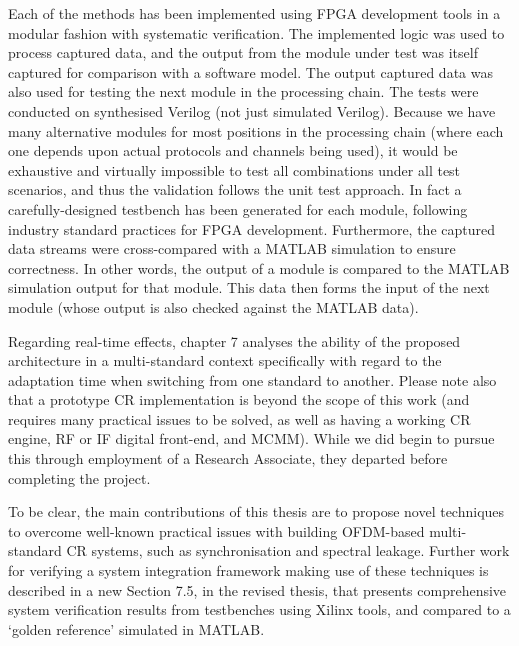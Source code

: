 \documentclass{article}
\begin{document}
Each of the methods has been implemented using FPGA development tools in a modular fashion with systematic verification. The implemented logic was used to process captured data, and the output from the module under test was itself captured for comparison with a software model. The output captured data was also used for testing the next module in the processing chain. The tests were conducted on synthesised Verilog (not just simulated Verilog). Because we have many alternative modules for most positions in the processing chain (where each one depends upon actual protocols and channels being used), it would be exhaustive and virtually impossible to test all combinations under all test scenarios, and thus the validation follows the unit test approach.
In fact a carefully-designed testbench has been generated for each module, following industry standard practices for FPGA development.
Furthermore, the captured data streams were cross-compared with a MATLAB simulation to ensure correctness. In other words, the output of a module is compared to the MATLAB simulation output for that module. This data then forms the input of the next module (whose output is also checked against the MATLAB data).

Regarding real-time effects, chapter 7 analyses the ability of the proposed architecture in a multi-standard context specifically with regard to the adaptation time when switching from one standard to another. %
Please note also that a prototype CR implementation is beyond the scope of this work (and requires many practical issues to be solved, as well as having a working CR engine, RF or IF digital front-end, and MCMM).
While we did begin to pursue this through employment of a Research Associate, they departed before completing the project.

To be clear, the main contributions of this thesis are to propose novel techniques to overcome well-known practical issues with building OFDM-based multi-standard CR systems, such as synchronisation and spectral leakage. %
Further work for verifying a system integration framework making use of these techniques is described in a new Section 7.5, in the revised thesis, that presents comprehensive system verification results from testbenches using Xilinx tools, and compared to a `golden reference' simulated in MATLAB. \newline
\end{document}
